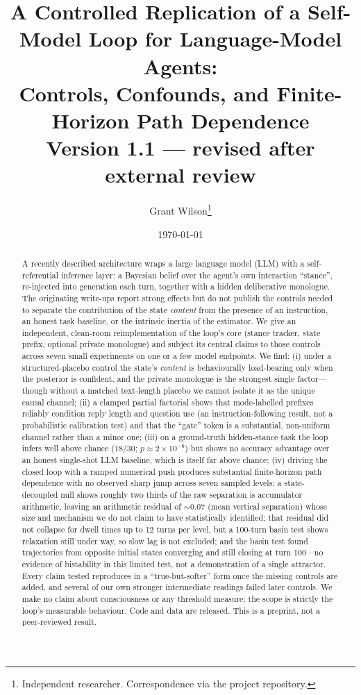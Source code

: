 \documentclass[11pt]{article}
\title{A Controlled Replication of a Self-Model Loop for Language-Model Agents:\\
Controls, Confounds, and Finite-Horizon Path Dependence\\
{\large Version 1.1 --- revised after external review}}
\author{Grant Wilson\thanks{Independent researcher. Correspondence via the
project repository.}}
\date{\today}
\begin{document}
\maketitle

\begin{abstract}
A recently described architecture wraps a large language model (LLM) with a
self-referential inference layer: a Bayesian belief over the agent's own
interaction ``stance'', re-injected into generation each turn, together with a
hidden deliberative monologue. The originating write-ups report strong effects
but do not publish the controls needed to separate the contribution of the state
\emph{content} from the presence of an instruction, an honest task baseline, or
the intrinsic inertia of the estimator. We give an independent, clean-room reimplementation of the loop's core (stance
tracker, state prefix, optional private monologue) and subject its central
claims to those controls across seven small experiments on one or a few model
endpoints.
We find: (i) under a structured-placebo control the state's \emph{content} is
behaviourally load-bearing only when the posterior is confident, and the private
monologue is the strongest single factor---though without a matched text-length
placebo we cannot isolate it as the unique causal channel; (ii) a clamped partial
factorial shows that mode-labelled prefixes reliably condition reply length and
question use (an instruction-following result, not a probabilistic calibration
test) and that the ``gate'' token is a substantial, non-uniform channel rather
than a minor one; (iii) on a ground-truth hidden-stance task the loop infers well
above chance (18/30; $p\approx2\times10^{-6}$) but shows no accuracy advantage
over an honest single-shot LLM baseline, which is itself far above chance; (iv)
driving the closed loop with a ramped numerical push produces substantial
finite-horizon path dependence with no observed sharp jump across seven sampled
levels; a state-decoupled null shows roughly two thirds of the raw separation is
accumulator arithmetic, leaving an arithmetic residual of $\sim$0.07 (mean
vertical separation) whose size and mechanism we do not claim to have
statistically identified; that residual did not collapse for dwell times up to
12 turns per level, but a 100-turn basin test shows relaxation still under way,
so slow lag is not excluded; and the basin test found trajectories from opposite
initial states converging and still closing at turn 100---no evidence of
bistability in this limited test, not a demonstration of a single attractor.
Every claim tested reproduces in a ``true-but-softer'' form once the missing
controls are added, and several of our own stronger intermediate readings failed
later controls. We make no claim about consciousness or any threshold measure;
the scope is strictly the loop's measurable behaviour. Code and data are
released. This is a preprint, not a peer-reviewed result.
\end{abstract}
\end{document}
